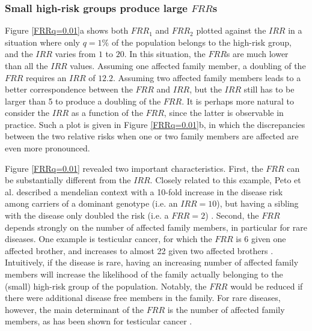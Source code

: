 \documentclass{bmcart}
\begin{document}
\subsubsection*{\\Small high-risk groups produce large $FRR$s}
Figure \ref{FRRq=0.01}a shows both $FRR_1$ and $FRR_2$ plotted against the $IRR$ in a situation where only $q=1\%$ of the population belongs to the high-risk group, and the $IRR$ varies from $1$ to $20$. In this situation, the $FRR$s are much lower than all the $IRR$ values. Assuming one affected family member, a doubling of the $FRR$ requires an $IRR$ of $12.2$. Assuming two affected family members leads to a better correspondence between the $FRR$ and $IRR$, but the $IRR$ still has to be larger than 5 to produce a doubling of the $FRR$. It is perhaps more natural to consider the $IRR$ as a function of the $FRR$, since the latter is observable in practice. Such a plot is given in Figure \ref{FRRq=0.01}b, in which the discrepancies between the two relative risks when one or two family members are affected are even more pronounced.

Figure \ref{FRRq=0.01} revealed two important characteristics. First, the $FRR$ can be substantially different from the $IRR$. Closely related to this example, Peto et al. described a mendelian context with a 10-fold increase in the disease risk among carriers of a dominant genotype (i.e. an $IRR = 10$), but having a sibling with the disease only doubled the risk (i.e. a $FRR = 2$) \cite{peto1980banbury}. Second, the $FRR$ depends strongly on the number of affected family members, in particular for rare diseases. One example is testicular cancer, for which the $FRR$ is 6 given one affected brother, and increases to almost 22 given two affected brothers \cite{valberg2014hierarchical}. Intuitively, if the disease is rare, having an increasing number of affected family members will increase the likelihood of the family actually belonging to the (small) high-risk group of the population. Notably, the $FRR$ would be reduced if there were additional disease free members in the family. For rare diseases, however, the main determinant of the $FRR$ is the number of affected family members, as has been shown for testicular cancer \cite{valberg2014hierarchical}.
\end{document}
